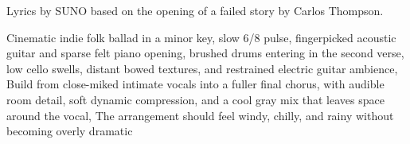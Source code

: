 
\begin{notes}
Lyrics by SUNO based on the opening of a failed story by Carlos Thompson.
\end{notes}
\begin{style}
Cinematic indie folk ballad in a minor key, slow 6/8 pulse, fingerpicked acoustic guitar and sparse felt piano opening, brushed drums entering in the second verse, low cello swells, distant bowed textures, and restrained electric guitar ambience, Build from close-miked intimate vocals into a fuller final chorus, with audible room detail, soft dynamic compression, and a cool gray mix that leaves space around the vocal, The arrangement should feel windy, chilly, and rainy without becoming overly dramatic
\end{style}
